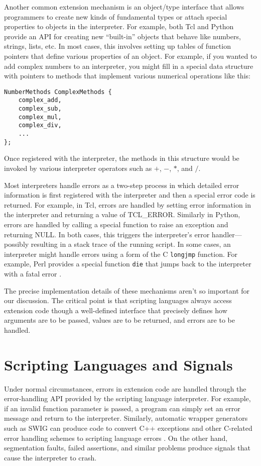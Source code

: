 Another common extension mechanism is an object/type interface that allows programmers to create new
kinds of fundamental types or attach special properties to objects in
the interpreter.  For example, both Tcl and Python provide an API for creating new 
``built-in'' objects that behave like numbers, strings, lists, etc.  
In most cases, this involves setting up tables of function
pointers that define various properties of an object.  For example, if
you wanted to add complex numbers to an interpreter, you might fill in a special
data structure with pointers to methods that implement various numerical operations like this:

\begin{verbatim}
NumberMethods ComplexMethods {
    complex_add,
    complex_sub,
    complex_mul,
    complex_div,
    ...
};
\end{verbatim}

\noindent
Once registered with the interpreter, the methods in this structure
would be invoked by various interpreter operators such as $+$,
$-$, $*$, and $/$.

Most interpreters handle errors as a two-step process in which
detailed error information is first registered with the interpreter
and then a special error code is returned. For example, in Tcl, errors
are handled by setting error information in the interpreter and
returning a value of TCL\_ERROR.  Similarly in Python, errors are
handled by calling a special function to raise an exception and returning NULL.  In both cases,
this triggers the interpreter's error handler---possibly resulting in
a stack trace of the running script.  In some cases, an interpreter
might handle errors using a form of the C {\tt longjmp} function. 
For example, Perl provides a special function {\tt die} that jumps back
to the interpreter with a fatal error \cite{advperl}.

The precise implementation details of these mechanisms aren't so
important for our discussion.  The critical point is that scripting
languages always access extension code though a well-defined interface
that precisely defines how arguments are to be passed, values are to be
returned, and errors are to be handled.

\section{Scripting Languages and Signals}

Under normal circumstances, errors in extension code are handled
through the error-handling API provided by the scripting language
interpreter.  For example, if an invalid function parameter is passed,
a program can simply set an error message and return to the
interpreter.  Similarly, automatic wrapper generators such as SWIG can produce
code to convert C++ exceptions and other C-related error handling
schemes to scripting language errors \cite{swigexcept}. On the other
hand, segmentation faults, failed assertions, and similar problems
produce signals that cause the interpreter to crash.

